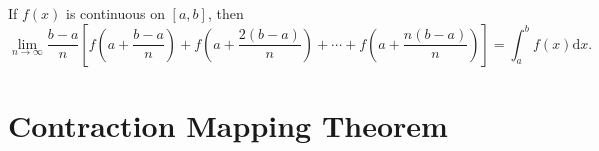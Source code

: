 \begin{proposition}{}{}
  If $f(x)$ is continuous on $[a,b]$, then
  \begin{equation}
    \lim \limits _{n \rightarrow \infty} \frac{b - a}{n} \left[
      f(a + \frac{b - a}{n}) + f( a + \frac{2(b-a)}{n}) + \cdots + f(a + \frac{n(b-a)}{n})
    \right] = \int_a^b f(x) \mathrm{d} x.
  \end{equation}
\end{proposition}

\section{Contraction Mapping Theorem}


